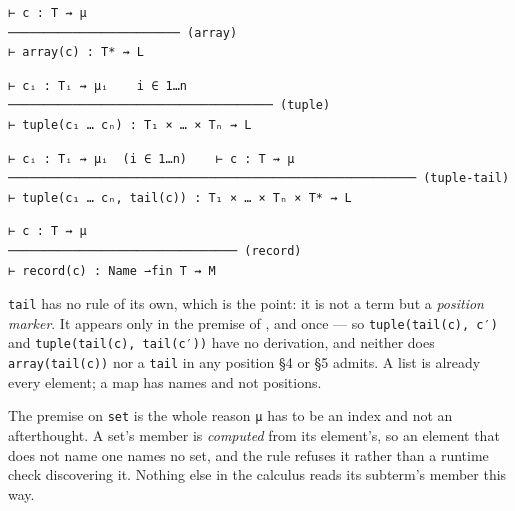 \begin{definition}[(array)]
\label{rule:array}
\leanok
\begin{verbatim}
⊢ c : T ⇝ μ
──────────────────────── (array)
⊢ array(c) : T* ⇝ L
\end{verbatim}
\end{definition}

\begin{definition}[(tuple)]
\label{rule:tuple}
\leanok
\begin{verbatim}
⊢ cᵢ : Tᵢ ⇝ μᵢ    i ∈ 1…n
───────────────────────────────────── (tuple)
⊢ tuple(c₁ … cₙ) : T₁ × … × Tₙ ⇝ L
\end{verbatim}
\end{definition}

\begin{definition}
\label{rule:tuple-tail}
\leanok
\begin{verbatim}
⊢ cᵢ : Tᵢ ⇝ μᵢ  (i ∈ 1…n)    ⊢ c : T ⇝ μ
───────────────────────────────────────────────────────── (tuple-tail)
⊢ tuple(c₁ … cₙ, tail(c)) : T₁ × … × Tₙ × T* ⇝ L
\end{verbatim}
\end{definition}

\begin{definition}[(record)]
\label{rule:record}
\leanok
\begin{verbatim}
⊢ c : T ⇝ μ
──────────────────────────────── (record)
⊢ record(c) : Name ⇀fin T ⇝ M
\end{verbatim}
\end{definition}

\texttt{tail} has no rule of its own, which is the point: it is not a term but a \emph{position marker}.
It appears only in the premise of , and once — so
\texttt{tuple(tail(c),\ c′)} and \texttt{tuple(tail(c),\ tail(c′))} have no derivation, and neither does
\texttt{array(tail(c))} nor a \texttt{tail} in any position §4 or §5 admits. A list is already every element; a map
has names and not positions.

The premise on \texttt{set} is the whole reason \texttt{μ} has to be an index and not an afterthought. A set's
member is \emph{computed} from its element's, so an element that does not name one names no set, and the
rule refuses it rather than a runtime check discovering it. Nothing else in the calculus reads its
subterm's member this way.

